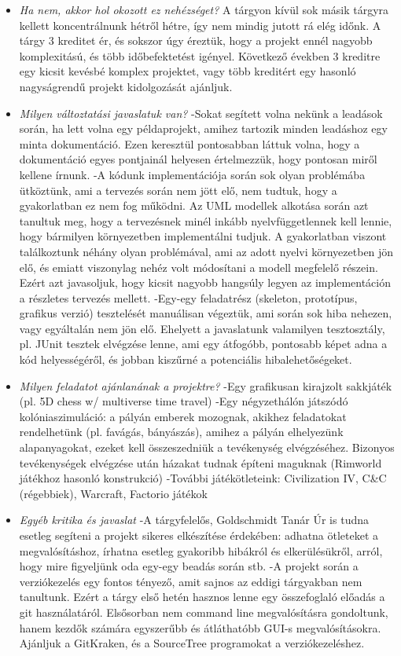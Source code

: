 \documentclass[../../projlab]{subfiles}
\begin{document}
\begin{itemize}
\item \textit{Ha nem, akkor hol okozott ez nehézséget?} \newline
    A tárgyon kívül sok másik tárgyra kellett koncentrálnunk hétről hétre, így nem mindig jutott rá elég időnk. A tárgy 3 kreditet ér, és sokszor úgy éreztük, hogy a projekt ennél nagyobb komplexitású, és több időbefektetést igényel. Következő években 3 kreditre egy kicsit kevésbé komplex projektet, vagy több kreditért egy hasonló nagyságrendű projekt kidolgozását ajánljuk. 
\item \textit{Milyen változtatási javaslatuk van?} \newline
    -Sokat segített volna nekünk a leadások során, ha lett volna egy példaprojekt, amihez tartozik minden leadáshoz egy minta dokumentáció. Ezen keresztül pontosabban láttuk volna, hogy a dokumentáció egyes pontjainál helyesen értelmezzük, hogy pontosan miről kellene írnunk. 
    -A kódunk implementációja során sok olyan problémába ütköztünk, ami a tervezés során nem jött elő, nem tudtuk, hogy a gyakorlatban ez nem fog működni. Az UML modellek alkotása során azt tanultuk meg, hogy a tervezésnek minél inkább nyelvfüggetlennek kell lennie, hogy bármilyen környezetben implementálni tudjuk. A gyakorlatban viszont találkoztunk néhány olyan problémával, ami az adott nyelvi környezetben jön elő, és emiatt viszonylag nehéz volt módosítani a modell megfelelő részein. Ezért azt javasoljuk, hogy kicsit nagyobb hangsúly legyen az implementáción a részletes tervezés mellett. 
    -Egy-egy feladatrész (skeleton, prototípus, grafikus verzió) tesztelését manuálisan végeztük, ami során sok hiba nehezen, vagy egyáltalán nem jön elő. Ehelyett a javaslatunk valamilyen tesztosztály, pl. JUnit tesztek elvégzése lenne, ami egy átfogóbb, pontosabb képet adna a kód helyességéről, és jobban kiszűrné a potenciális hibalehetőségeket. 
\item \textit{Milyen feladatot ajánlanának a projektre?} \newline
    -Egy grafikusan kirajzolt sakkjáték (pl. 5D chess w/ multiverse time travel)
    -Egy négyzethálón játszódó kolóniaszimuláció: a pályán emberek mozognak, akikhez feladatokat rendelhetünk (pl. favágás, bányászás), amihez a pályán elhelyezünk alapanyagokat, ezeket kell összeszedniük a tevékenység elvégzéséhez. Bizonyos tevékenységek elvégzése után házakat tudnak építeni maguknak (Rimworld játékhoz hasonló konstrukció)
    -További játékötleteink: Civilization IV, C\&C (régebbiek), Warcraft, Factorio játékok  
\item \textit{Egyéb kritika és javaslat} \newline
    -A tárgyfelelős, Goldschmidt Tanár Úr is tudna esetleg segíteni a projekt sikeres elkészítése érdekében: adhatna ötleteket a megvalósításhoz, írhatna esetleg gyakoribb hibákról és elkerülésükről, arról, hogy mire figyeljünk oda egy-egy beadás során stb. 
    -A projekt során a verziókezelés egy fontos tényező, amit sajnos az eddigi tárgyakban nem tanultunk. Ezért a tárgy első hetén hasznos lenne egy összefoglaló előadás a git használatáról. Elsősorban nem command line megvalósításra gondoltunk, hanem kezdők számára egyszerűbb és átláthatóbb GUI-s megvalósításokra. Ajánljuk a GitKraken, és a SourceTree programokat a verziókezeléshez.
\end{itemize}
\end{document}
